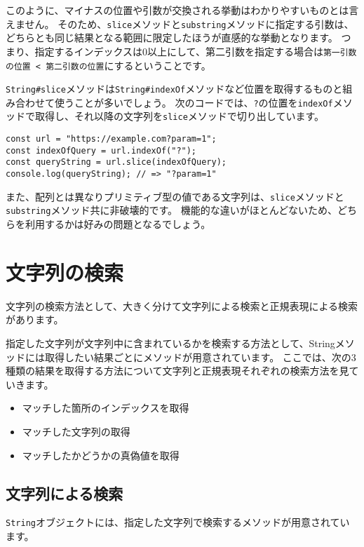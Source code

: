 このように、マイナスの位置や引数が交換される挙動はわかりやすいものとは言えません。
そのため、\texttt{slice}メソッドと\texttt{substring}メソッドに指定する引数は、どちらとも同じ結果となる範囲に限定したほうが直感的な挙動となります。
つまり、指定するインデックスは0以上にして、第二引数を指定する場合は\texttt{第一引数の位置 < 第二引数の位置}にするということです。

\texttt{String\#slice}メソッドは\texttt{String\#indexOf}メソッドなど位置を取得するものと組み合わせて使うことが多いでしょう。
次のコードでは、\texttt{?}の位置を\texttt{indexOf}メソッドで取得し、それ以降の文字列を\texttt{slice}メソッドで切り出しています。

\begin{lstlisting}
const url = "https://example.com?param=1";
const indexOfQuery = url.indexOf("?");
const queryString = url.slice(indexOfQuery);
console.log(queryString); // => "?param=1"
\end{lstlisting}

また、配列とは異なりプリミティブ型の値である文字列は、\texttt{slice}メソッドと\texttt{substring}メソッド共に非破壊的です。
機能的な違いがほとんどないため、どちらを利用するかは好みの問題となるでしょう。

\hypertarget{search}{%
\section{文字列の検索}\label{search}}

文字列の検索方法として、大きく分けて文字列による検索と正規表現による検索があります。

指定した文字列が文字列中に含まれているかを検索する方法として、Stringメソッドには取得したい結果ごとにメソッドが用意されています。
ここでは、次の3種類の結果を取得する方法について文字列と正規表現それぞれの検索方法を見ていきます。

\begin{itemize}
\item
  マッチした箇所のインデックスを取得
\item
  マッチした文字列の取得
\item
  マッチしたかどうかの真偽値を取得
\end{itemize}

\hypertarget{search-by-string}{%
\subsection{文字列による検索}\label{search-by-string}}

\texttt{String}オブジェクトには、指定した文字列で検索するメソッドが用意されています。

